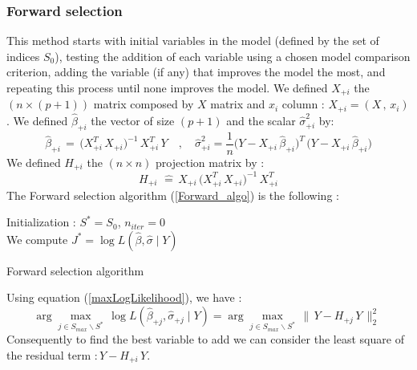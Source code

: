 \subsubsection{Forward selection}
This method starts with initial variables in the model (defined by the set of indices $S_0$), testing the addition of each variable 
using a chosen model comparison criterion, adding the variable (if any) that improves the model the most, and repeating this process until none improves the model.
We defined $X_{+i}$ the $(n \times (p+1))$ matrix composed by $X$ matrix and $x_i$ column : $X_{+i} = (X \,,\,x_i)$.
We defined $\hat{\beta}_{+i}$ the vector of size $(p+1)$ and the scalar $\hat{\sigma}_{+i}^2$ by:  
 \begin{equation}
  \hat{\beta}_{+i} \,=\, \big(X^T_{+i} \,X_{+i}\big)^{-1} \,X^T_{+i} \, Y
\quad,\quad 
\hat{\sigma}_{+i}^2 = \frac{1}{n}\big(Y-X_{+i} \,\hat{\beta}_{+i}\big)^T\,\big(Y-X_{+i} \,\hat{\beta}_{+i}\big)
\end{equation}
We defined $H_{+i} $ the $(n\times n)$ projection matrix by :
 \begin{equation}
\label{H+}
H_{+i}\, \,\hat{=} \, X_{+i}\,\big(X^T_{+i} \,X_{+i}\big)^{-1} \,X^T_{+i}  
 \end{equation}
The Forward selection algorithm (\ref{Forward_algo}) is the following : 
\begin{algorithm}
\label{Forward_algo}
Initialization : $S^* = S_0$, $n_{iter} = 0 $\\
We compute $J^* = \log L(\hat{\beta},\hat{\sigma}\mid Y)$  \\
\caption{Forward selection algorithm }
\end{algorithm}

Using equation (\ref{maxLogLikelihood}), we have : 
 \begin{equation}
\arg   \displaystyle\max_{j \in S_{max} \backslash S^*}\,  \log L(\hat{\beta}_{+j},\hat{\sigma}_{+j}\mid Y) = 
\arg \displaystyle\max_{j \in S_{max} \backslash S^*}\, \|\,Y-H_{+j}\,Y\,\|^2_2  \,\,
 \end{equation}
 Consequently to find the best variable to add we can consider the least square of the residual term $:Y-H_{+i}\,Y$. 





